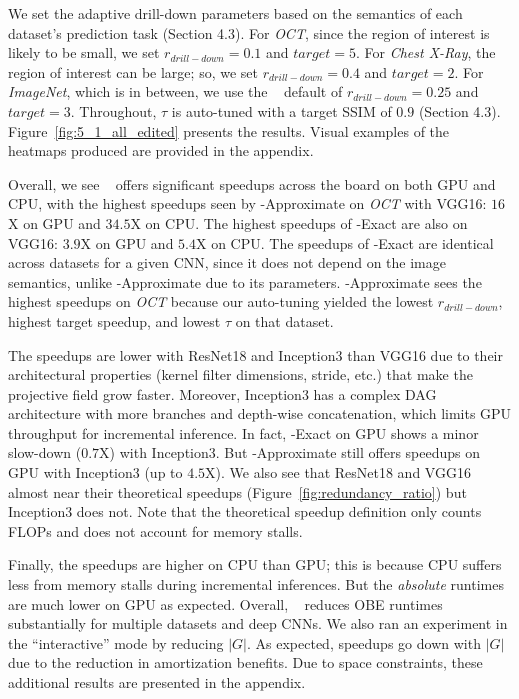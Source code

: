 We set the adaptive drill-down parameters based on the semantics of each dataset's prediction task (Section 4.3). For \textit{OCT}, since the region of interest is likely to be small, we set $r_{\mathit{drill}-\mathit{down}}=0.1$ and $\mathit{target} = 5$. For \textit{Chest X-Ray}, the region of interest can be large; so, we set $r_{\mathit{drill}-\mathit{down}} = 0.4$ and $\mathit{target} = 2$. For \textit{ImageNet}, which is in between, we use the \system~ default of $r_{\mathit{drill}-\mathit{down}}=0.25$  and $\mathit{target} = 3$. Throughout, $\tau$ is auto-tuned with a target SSIM of $0.9$ (Section 4.3). Figure~\ref{fig:5_1_all_edited} presents the results. Visual examples of the heatmaps produced are provided in the appendix.

Overall, we see \system~ offers significant speedups across the board on both GPU and CPU, with the highest speedups seen by \system-Approximate on \textit{OCT} with VGG16: $16$X on GPU and $34.5$X on CPU. The highest speedups of \system-Exact are also on VGG16: $3.9$X on GPU and $5.4$X on CPU. The speedups of \system-Exact are identical across datasets for a given CNN, since it does not depend on the image semantics, unlike \system-Approximate due to its parameters. \system-Approximate sees the highest speedups on \textit{OCT} because our auto-tuning yielded the lowest $r_{\mathit{drill}-\mathit{down}}$, highest target speedup, and lowest $\tau$ on that dataset. 

The speedups are lower with ResNet18 and Inception3 than VGG16 due to their architectural properties (kernel filter dimensions, stride, etc.) that make the projective field grow faster. Moreover, Inception3 has a complex DAG architecture with more branches and depth-wise concatenation, which limits GPU throughput for incremental inference. In fact, \system-Exact on GPU shows a minor slow-down ($0.7$X) with Inception3. But \system-Approximate still offers speedups on GPU with Inception3 (up to $4.5$X). We also see that ResNet18 and VGG16 almost near their theoretical speedups (Figure~\ref{fig:redundancy_ratio}) but Inception3 does not. Note that the theoretical speedup definition only counts FLOPs and does not account for memory stalls.

Finally, the speedups are higher on CPU than GPU; this is because CPU suffers less from memory stalls during incremental inferences. But the \textit{absolute} runtimes are much lower on GPU as expected. Overall, \system~ reduces OBE runtimes substantially for multiple datasets and deep CNNs. We also ran an experiment in the ``interactive'' mode by reducing $|G|$. As expected, speedups go down with $|G|$ due to the reduction in amortization benefits. Due to space constraints, these additional results are presented in the appendix.

